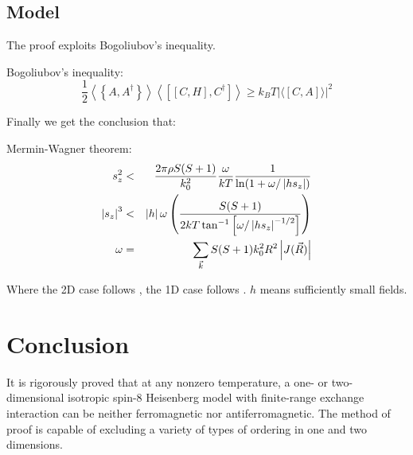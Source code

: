 \subsection{Model}
The proof exploits Bogoliubov's inequality.
\begin{theorem}
    Bogoliubov's inequality: \\
    \begin{equation}
        \frac{1}{2} \left\langle \left\{ A, A^{\dagger} \right\} \right\rangle \left\langle \left[ \left[ C, H \right], C^{\dagger} \right] \right\rangle 
        \ge k_B T \left|\langle\left[ C, A \right]\rangle\right|^2
    \end{equation}
\end{theorem}

Finally we get the conclusion that:
\begin{theorem}
    Mermin-Wagner theorem: \\
    \begin{eqnarray}
        s_z^2 &<& \frac{2\pi\rho S(S+1)}{k_0^2} \frac{\omega}{kT} \frac{1}{\ln(1 + \omega/ \left| h s_z \right|)} \labeq{eqn:2D_Case}\\
        \left| s_z \right|^3 &<& \left| h \right| \omega \left( \frac{S(S+1)}{2kT \tan^{-1}\left[ \omega/ \left| hs_z \right|^{-1/2} \right]} \right) \labeq{eqn:1D_Case}\\
        \omega &=& \sum_{\vec{k}} S(S+1) k_0^2 R^2 \left| J(\vec{R}) \right| \nonumber
    \end{eqnarray}
\end{theorem}
Where the 2D case follows , the 1D case follows . $h$ means sufficiently small fields.
\section{Conclusion}
It is rigorously proved that at any nonzero temperature, a one- or two-dimensional isotropic spin-8 Heisenberg model with finite-range exchange interaction can be neither ferromagnetic nor antiferromagnetic. The method of proof is capable of excluding a variety of types of ordering in one and two dimensions.

